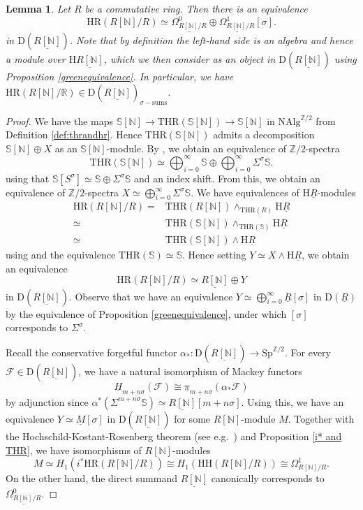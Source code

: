 \documentclass[10pt]{amsart}
\newtheorem{lem}[thm]{Lemma}
\theoremstyle{definition}
\numberwithin{equation}{section}
\newcommand{\N}{\mathbb{N}}
\newcommand{\R}{\mathbb{R}}
\newcommand{\Sphere}{\mathbb{S}}
\newcommand{\Z}{\mathbb{Z}}
\newcommand{\cF}{\mathcal{F}}
\newcommand{\rD}{\mathrm{D}}
\newcommand{\rH}{\mathrm{H}}
\newcommand{\ul}{\underline}
\newcommand{\NAlg}{\mathrm{NAlg}}
\newcommand{\Sp}{\mathrm{Sp}}
\newcommand{\HH}{\mathrm{HH}}
\newcommand{\HR}{\mathrm{HR}}
\newcommand{\THR}{\mathrm{THR}}
\begin{document}
\begin{lem}
\label{HR(R[N])}
Let $R$ be a commutative ring.
Then there is an equivalence
\[
\HR(R[\N]/R)
\simeq
\ul{\Omega_{R[\N]/R}^0} \oplus
\ul{\Omega_{R[\N]/R}^1} [\sigma].
\]
in $\rD(\ul{R[\N]})$.
Note that by definition the left-hand side is an algebra and hence a module over $\rH \ul{R[\N]}$,
which we then consider as an object in  $\rD(\ul{R[\N]})$ using \textup{Proposition \ref{greenequivalence}}.
In particular,
we have $
\HR(R[\N]/\R)\in \rD(\ul{R[\N]})_{\sigma-\mathrm{sums}}.
$
\end{lem}
\begin{proof}
We have the maps $\Sphere[\N]\to \THR(\Sphere[\N])\to \Sphere[\N]$ in $\NAlg^{\Z/2}$ from Definition \ref{def:thrandhr}.
Hence $\THR(\Sphere[\N])$ admits a decomposition $\Sphere[\N]\oplus X$ as an $\Sphere[\N]$-module.
By \cite[Propositions 4.2.11, 4.2.13]{HP23},
we obtain an equivalence of $\Z/2$-spectra
\[
\THR(\Sphere[\N])
\simeq
\bigoplus_{i=0}^\infty \Sphere
\oplus
\bigoplus_{i=0}^\infty \Sigma^\sigma \Sphere.
\]
using that $\Sphere[S^{\sigma}] \simeq \Sphere \oplus \Sigma^{\sigma}\Sphere$ and an index shift.
From this,
we obtain an equivalence of $\Z/2$-spectra
\(
X
\simeq
\bigoplus_{i=0}^\infty \Sigma^\sigma \Sphere.
\)
We have equivalences of $\rH \ul{R}$-modules
\begin{align*}
\HR(R[\N]/R)
= &
\THR(R[\N])
\wedge_{\THR(R)}
\rH \ul{R}
\\
\simeq &
\THR(\Sphere[\N])
\wedge_{\THR(\Sphere)}
\rH \ul{R}
\\
\simeq &
\THR(\Sphere[\N]) \wedge \rH \ul{R}
\end{align*}
using \cite[Proposition 4.2.15]{HP23} and the equivalence $\THR(\Sphere)\simeq \Sphere$.
Hence setting $Y\simeq X\wedge \rH \ul{R}$, we obtain an equivalence
\[
\HR(R[\N]/R)
\simeq
\ul{R[\N]} \oplus Y
\]
in $\rD(\ul{R[\N]})$.
Observe that we have an equivalence $Y\simeq \bigoplus_{i=0}^\infty \ul{R}[\sigma]$ in $\rD(\ul{R})$ by the equivalence of Proposition \ref{greenequivalence},
under which $[\sigma]$ corresponds to $\Sigma^{\sigma}$.

Recall the conservative forgetful functor $\alpha_*\colon \rD(\ul{R[\N]})\to \Sp^{\Z/2}$.
For every $\cF\in \rD(\ul{R[\N]})$,
we have a natural isomorphism of Mackey functors
\[
\ul{H}_{m+n\sigma}(\cF)\cong \ul{\pi}_{m+n\sigma}(\alpha_*\cF)
\]
by adjunction since $\alpha^*(\Sigma^{m+n\sigma}\Sphere)
\simeq
\ul{R[\N]}[m+n\sigma]$.
Using this,
we have an equivalence $Y\simeq \ul{M}[\sigma]$ in $\rD(\ul{R[\N]})$ for some
$R[\N]$-module $M$.
Together with the Hochschild-Kostant-Rosenberg theorem (see e.g.\ \cite[Theorem 3.4.4]{Lo})
and Proposition \ref{i* and THR},
we have isomorphisms of $R[\N]$-modules
\[
M\simeq H_1(i^* \HR(R[\N]/R))\cong H_1(\HH(R[\N]/R))\cong \Omega_{R[\N]/R}^1.
\]
On the other hand, the direct summand $\ul{R[\N]}$ canonically corresponds to $\ul{\Omega_{R[\N]/R}^0}$.
\end{proof}
\end{document}
